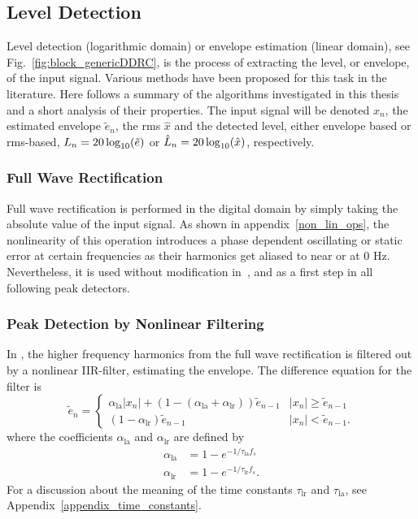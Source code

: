 \documentclass[../main2.tex]{subfiles}
\begin{document}
\subsection{Level Detection}\label{level_detection}
Level detection (logarithmic domain) or envelope estimation (linear domain), see Fig.~\ref{fig:block_genericDDRC}, is the process of extracting the level, or envelope, of the input signal. Various methods have been proposed for this task in the literature. Here follows a summary of the algorithms investigated in this thesis and a short analysis of their properties. The input signal will be denoted $x_n$, the estimated envelope $\tilde{e}_n$, the rms $\hat{x}$ and the detected level, either envelope based or rms-based, $L_n = 20\log_{10}(\tilde{e})$ or $\hat{L}_n=20\log_{10}(\hat{x})$, respectively. 

\subsubsection{Full Wave Rectification}\label{full_wave_rect}
Full wave rectification is performed in the digital domain by simply taking the absolute value of the input signal. As shown in appendix~\ref{non_lin_ops}, the nonlinearity of this operation introduces a phase dependent oscillating or static error at certain frequencies as their harmonics get aliased to near or at 0 Hz. Nevertheless, it is used without modification in~\cite{reiss2012tutorial}, and as a first step in all following peak detectors.

\subsubsection{Peak Detection by Nonlinear Filtering}\label{peak_detection}
In \cite{mcnally1984dynamic, zolzer1997digital}, the higher frequency harmonics from the full wave rectification is filtered out by a nonlinear IIR-filter, estimating the envelope. The difference equation for the filter is
\begin{equation}\label{eq:analog_det}
\tilde{e}_n = \begin{cases}
    \alpha_\text{la} |x_n| + (1- (\alpha_\text{la} + \alpha_\text{lr})) \tilde{e}_{n-1}  	& |x_n| \geq \tilde{e}_{n-1} \\
    (1-\alpha_\text{lr}) \tilde{e}_{n-1} 							& |x_n| < \tilde{e}_{n-1}.
\end{cases}
\end{equation}
where the coefficients $\alpha_\text{la}$ and $\alpha_\text{lr}$ are defined by
\begin{align}
\alpha_\text{la} &= 1 - e^{-1/\tau_\text{la} f_s } \label{eq:attack_coeff_def}\\
\alpha_\text{lr} &= 1 - e^{-1/\tau_\text{lr} f_s } \label{eq:release_coeff_def}.
\end{align}
For a discussion about the meaning of the time constants $\tau_\text{lr}$ and $\tau_\text{la}$, see Appendix~\ref{appendix_time_constants}.
\end{document}
